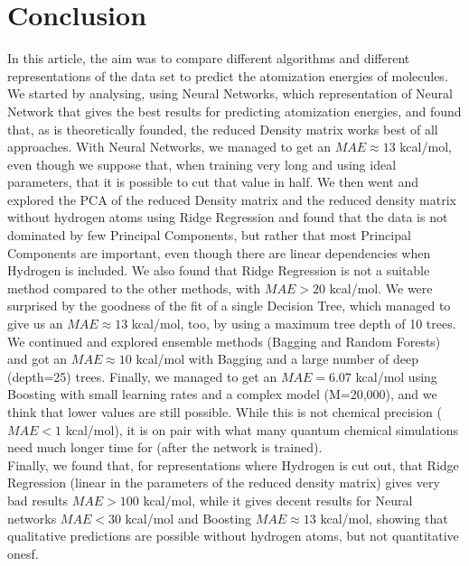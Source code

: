 \documentclass[11pt,a4paper,notitlepage]{article}
\begin{document}
\section{Conclusion}
In this article, the aim was to compare different algorithms and different representations of the data set to predict the atomization energies of molecules. We started by analysing, using Neural Networks, which representation of Neural Network that gives the best results for predicting atomization energies, and found that, as is theoretically founded, the reduced Density matrix works best of all approaches. With Neural Networks, we managed to get an $MAE \approx 13$ kcal/mol, even though we suppose that, when training very long and using ideal parameters, that it is possible to cut that value in half. We then went and explored the PCA of the reduced Density matrix and the reduced density matrix without hydrogen atoms using Ridge Regression and found that the data is not dominated by few Principal Components, but rather that most Principal Components are important, even though there are linear dependencies when Hydrogen is included. We also found that Ridge Regression is not a suitable method compared to the other methods, with  $MAE>20$ kcal/mol. We were surprised by the goodness of the fit of a single Decision Tree, which managed to give us an  $MAE \approx 13$ kcal/mol, too, by using a maximum tree depth of 10 trees. We continued and explored ensemble methods (Bagging and Random Forests) and got an $MAE \approx 10$ kcal/mol with Bagging and a large number of deep (depth=25) trees. Finally, we managed to get an $MAE = 6.07$ kcal/mol using Boosting with small learning rates and a complex model (M=20,000), and we think that lower values are still possible. While this is not chemical precision ($MAE < 1$ kcal/mol), it is on pair with what many quantum chemical simulations need much longer time for (after the network is trained). \\ Finally, we found that, for representations where Hydrogen is cut out, that Ridge Regression (linear in the parameters of the reduced density matrix) gives very bad results $MAE > 100$ kcal/mol, while it gives decent results for Neural networks  $MAE < 30$ kcal/mol and Boosting  $MAE \approx 13$ kcal/mol, showing that qualitative predictions are possible without hydrogen atoms, but not quantitative onesf. \\
\end{document}
